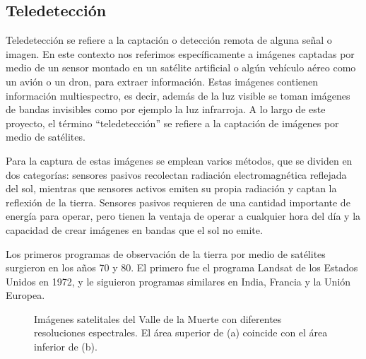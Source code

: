 \subsection{Teledetección}

Teledetección se refiere a la captación o detección remota de alguna señal o imagen. En este contexto nos referimos
específicamente a imágenes captadas por medio de un sensor montado en un satélite artificial o algún vehículo aéreo
como un avión o un dron, para extraer información. Estas imágenes contienen información multiespectro, es decir, además
de la luz visible se toman imágenes de bandas invisibles como por ejemplo la luz infrarroja.
\autocite{globalforestlink-how-sat-imaging-work} A lo largo de este proyecto, el término \enquote{teledetección} se
refiere a la captación de imágenes por medio de satélites.

Para la captura de estas imágenes se emplean varios métodos, que se dividen en dos categorías: sensores pasivos
recolectan radiación electromagnética reflejada del sol, mientras que sensores activos emiten su propia radiación y
captan la reflexión de la tierra. Sensores pasivos requieren de una cantidad importante de energía para operar, pero
tienen la ventaja de operar a cualquier hora del día y la capacidad de crear imágenes en bandas que el sol no emite.
\autocite{globalforestlink-how-sat-imaging-work}

Los primeros programas de observación de la tierra por medio de satélites surgieron en los años 70 y 80. El primero fue
el programa Landsat de los Estados Unidos en 1972, y le siguieron programas similares en India, Francia y la Unión
Europea. \autocite{esa-space-year-2007}

\begin{figure}
    \centering
    \qquad
    \caption{Imágenes satelitales del Valle de la Muerte con diferentes resoluciones espectrales. El área superior de (a)
    coincide con el área inferior de (b).}
    \label{fig:1}
\end{figure}

